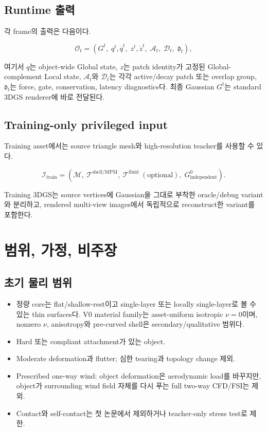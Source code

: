 \documentclass[11pt,a4paper]{article}
\begin{document}
\subsection{Runtime 출력}

각 frame의 출력은 다음이다.

\begin{equation}
  \mathcal O_t
  =
  \left(
    G^t,\;
    q^t,\dot q^t,\;
    z^t,\dot z^t,\;
    \mathcal A_t,\;
    \mathcal D_t,\;
    \mathfrak d_t
  \right),
\end{equation}

여기서 \(q\)는 object-wide Global state,
\(z\)는 patch identity가 고정된 Global-complement Local state,
\(\mathcal A_t\)와 \(\mathcal D_t\)는 각각 active/decay patch 또는 overlap group,
\(\mathfrak d_t\)는 force, gate, conservation, latency diagnostics다.
최종 Gaussian \(G^t\)는 standard 3DGS renderer에 바로 전달된다.

\subsection{Training-only privileged input}

Training asset에서는 source triangle mesh와 high-resolution teacher를 사용할 수 있다.

\begin{equation}
  \mathcal I_{\mathrm{train}}
  =
  \left(
    \mathcal M,\;
    \mathcal T^{\mathrm{shell/MPM}},\;
    \mathcal T^{\mathrm{fluid}}\;(\text{optional}),\;
    G^0_{\mathrm{independent}}
  \right).
\end{equation}

Training 3DGS는 source vertices에 Gaussian을 그대로 부착한 oracle/debug variant와 분리하고,
rendered multi-view images에서 독립적으로 reconstruct한 variant를 포함한다.

\section{범위, 가정, 비주장}

\subsection{초기 물리 범위}

\begin{itemize}[leftmargin=1.5em]
  \item 정량 core는 flat/shallow-rest이고 single-layer 또는 locally single-layer로 볼 수 있는 thin surfaces다.
  V0 material family는 asset-uniform isotropic \(\nu=0\)이며,
  nonzero \(\nu\), anisotropy와 pre-curved shell은 secondary/qualitative 범위다.
  \item Hard 또는 compliant attachment가 있는 object.
  \item Moderate deformation과 flutter; 심한 tearing과 topology change 제외.
  \item Prescribed one-way wind: object deformation은 aerodynamic load를 바꾸지만,
  object가 surrounding wind field 자체를 다시 푸는 full two-way CFD/FSI는 제외.
  \item Contact와 self-contact는 첫 논문에서 제외하거나 teacher-only stress test로 제한.
\end{itemize}
\end{document}
